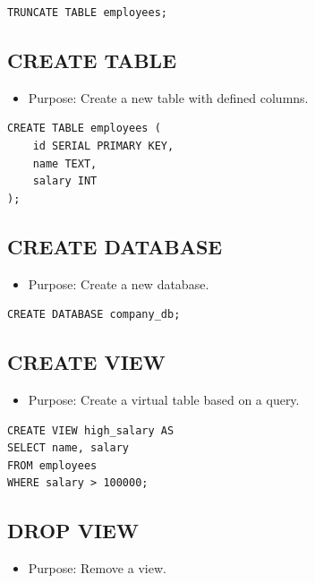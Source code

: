 \documentclass[10pt]{article}
\begin{document}
\begin{verbatim}
TRUNCATE TABLE employees;
\end{verbatim}

\subsection{CREATE TABLE}
\begin{itemize}
    \item Purpose: Create a new table with defined columns.
\end{itemize}

\begin{verbatim}
CREATE TABLE employees (
    id SERIAL PRIMARY KEY,
    name TEXT,
    salary INT
);
\end{verbatim}

\subsection{CREATE DATABASE}
\begin{itemize}
    \item Purpose: Create a new database.
\end{itemize}

\begin{verbatim}
CREATE DATABASE company_db;
\end{verbatim}

\subsection{CREATE VIEW}
\begin{itemize}
    \item Purpose: Create a virtual table based on a query.
\end{itemize}

\begin{verbatim}
CREATE VIEW high_salary AS
SELECT name, salary
FROM employees
WHERE salary > 100000;
\end{verbatim}

\subsection{DROP VIEW}
\begin{itemize}
    \item Purpose: Remove a view.
\end{itemize}
\end{document}
